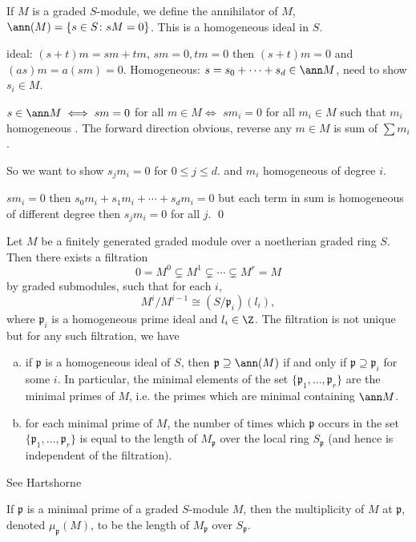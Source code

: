 \begin{prop}
If $M$ is a graded $S$-module, we define the annihilator of $M$, $\ann(M)= \{ s \in S \colon sM=0 \}$. This is a homogeneous ideal in $S$.
\end{prop}

\pf ideal: $(s+t)m= sm+tm$, $sm=0, tm=0$ then $(s+t)m=0$ and $(as)m= a(sm)=0$.
Homogeneous: $s= s_0+\cdots+s_d \in \ann M$, need to show $s_i \in M$. 


$s \in \ann M \iff sm=0$ for all $m \in M \iff$ $sm_i=0$ for all $m_i \in M$ such that $m_i$ homogeneous . The forward direction obvious, reverse any $m \in M$ is sum of $\sum m_i$. 

So we want to show $s_j m_i=0$ for $0 \leq j \leq d$. and $m_i$ homogeneous of degree $i$.

$sm_i=0$ then $s_0m_i+s_1m_i+\cdots+s_dm_i=0$ but each term in sum is homogeneous of different degree then $s_j m_i=0$ for all $j$. \qed 


\begin{prop} %
Let $M$ be a finitely generated graded module over a noetherian graded ring $S$. Then there exists a filtration 
	\[
	0 = M^0 \subsetneq M^1 \subsetneq \cdots \subsetneq M^r= M
	\]
by graded submodules, such that for each $i$,
	\[
	M^i/M^{i-1} \cong (S/\mathfrak{p}_i)(l_i),
	\]
where $\mathfrak{p}_i$ is a homogeneous prime ideal and $l_i \in \Z$. The filtration is not unique but for any such filtration, we have

\begin{enumerate}[(a)]
\item if $\mathfrak{p}$ is a homogeneous ideal of $S$, then $\mathfrak{p} \supseteq \ann(M)$ if and only if $\mathfrak{p} \supseteq \mathfrak{p}_i$ for some $i$. In particular, the minimal elements of the set $\{\mathfrak{p}_1,\ldots,\mathfrak{p}_r\}$ are the minimal primes of $M$, i.e. the primes which are minimal containing $\ann M$.
\item for each minimal prime of $M$, the number of times which $\mathfrak{p}$ occurs in the set $\{\mathfrak{p}_1,\ldots,\mathfrak{p}_r\}$ is equal to the length of $M_\mathfrak{p}$ over the local ring $S_\mathfrak{p}$ (and hence is independent of the filtration). 
\end{enumerate}
\end{prop}

\pf See Hartshorne



\begin{dfn}
If $\mathfrak{p}$ is a minimal prime of a graded $S$-module $M$, then the multiplicity of $M$ at $\mathfrak{p}$, denoted $\mu_\mathfrak{p}(M)$, to be the length of $M_\mathfrak{p}$ over $S_\mathfrak{p}$. 
\end{dfn}



